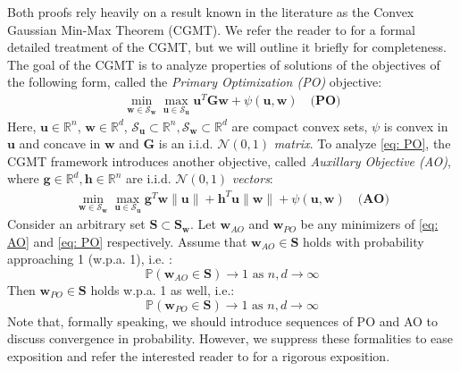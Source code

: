 \documentclass[final]{l4dc2026}
\newcommand{\bG}{\mathbf{G}}
\newcommand{\bS}{\mathbf{S}}
\newcommand{\bg}{\mathbf{g}}
\newcommand{\bh}{\mathbf{h}}
\newcommand{\bu}{\mathbf{u}}
\newcommand{\bw}{\mathbf{w}}
\newcommand{\bbR}{\mathbb{R}}
\newcommand{\calS}{\mathcal{S}}
\begin{document}
Both proofs rely heavily on a result known in the literature as the Convex Gaussian Min-Max Theorem (CGMT). We refer the reader to \cite{thrampoulidis2014gaussian, akhtiamov2025novel} for a formal detailed treatment of the CGMT, but we will outline it briefly for completeness. The goal of the CGMT is to analyze properties of solutions of the objectives of the following form, called the {\it Primary Optimization (PO)} objective:
\begin{align}\label{eq: PO}
    \min_{\bw \in \calS_\bw}  \max_{\bu \in \calS_\bu} \bu^T\bG\bw + \psi(\bu,\bw)\quad \textbf{(PO)}
\end{align}
Here, $\bu \in \bbR^n$, $\bw \in \bbR^d$, $\calS_\bu \subset \bbR^n, \calS_\bw \subset \bbR^d$ are compact convex sets, $\psi$ is convex in $\bu$ and concave in $\bw$ and $\bG$ is an i.i.d. $\mathcal{N}(0,1)$ {\it matrix}.  To analyze \eqref{eq: PO}, the CGMT framework introduces another objective, called {\it Auxillary Objective (AO)}, where $\bg \in \bbR^d, \bh \in \bbR^n$ are i.i.d. $\mathcal{N}(0,1)$ {\it vectors}:  
\begin{align}\label{eq: AO}
    \min_{\bw \in \calS_\bw}  \max_{\bu \in \calS_\bu} \bg^T\bw\|\bu\| + \bh^T\bu\|\bw\| +  \psi(\bu,\bw)\quad \textbf{(AO)}
\end{align}
Consider an arbitrary set $\bS \subset \bS_\bw$. Let $\bw_{AO}$ and $\bw_{PO}$ be any minimizers of \eqref{eq: AO} and \eqref{eq: PO} respectively. Assume that $\bw_{AO} \in \bS$ holds with probability approaching 1 (w.p.a. 1), i.e. :
$$\mathbb{P}\left(\bw_{AO} \in \bS \right) \to 1 \text{ as }n, d \to \infty$$
Then $\bw_{PO} \in \bS$ holds w.p.a. 1 as well, i.e.:
$$\mathbb{P}\left(\bw_{PO} \in \bS \right) \to 1 \text{ as }n, d \to \infty$$
Note that, formally speaking, we should introduce sequences of PO and AO to discuss convergence in probability. However, we suppress these formalities to ease exposition and refer the interested reader to \cite{thrampoulidis2014gaussian, akhtiamov2025novel} for a rigorous exposition. 
\end{document}
